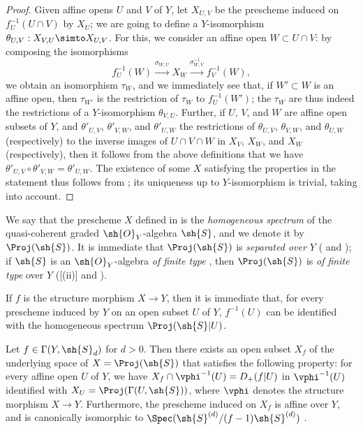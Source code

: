 \begin{proof}
Given affine opens $U$ and $V$ of $Y$, let $X_{U,V}$ be the prescheme induced on $f_U^{-1}(U\cap V)$ by $X_U$;
we are going to define a $Y$-isomorphism $\theta_{U,V}:X_{V,U}\simto X_{U,V}$.
For this, we consider an affine open $W\subset U\cap V$:
by composing the isomorphisms
\[
  f_U^{-1}(W)
  \xrightarrow{\sigma_{W,U}} X_W
  \xrightarrow{\sigma_{W,V}^{-1}} f_V^{-1}(W),
\]
we obtain an isomorphism $\tau_W$, and we immediately see that, if $W'\subset W$ is an affine open, then $\tau_{W'}$ is the restriction of $\tau_W$ to $f_U^{-1}(W')$;
the $\tau_W$ are thus indeed the restrictions of a $Y$-isomorphism $\theta_{V,U}$.
Further, if $U$, $V$, and $W$ are affine open subsets of $Y$, and $\theta'_{U,V}$, $\theta'_{V,W}$, and $\theta'_{U,W}$ the restrictions of $\theta_{U,V}$, $\theta_{V,W}$, and $\theta_{U,W}$ (respectively) to the inverse images of $U\cap V\cap W$ in $X_V$, $X_W$, and $X_W$ (respectively), then it follows from the above definitions that we have $\theta'_{U,V}\circ\theta'_{V,W}=\theta'_{U,W}$.
The existence of some $X$ satisfying the properties in the statement thus follows from ;
its uniqueness up to $Y$-isomorphism is trivial, taking  into account.
\end{proof}

\begin{env}[3.1.3]
\label{II.3.1.3}
We say that the prescheme $X$ defined in  is the \emph{homogeneous spectrum} of the quasi-coherent graded $\sh{O}_Y$-algebra $\sh{S}$, and we denote it by $\Proj(\sh{S})$.
It is immediate that $\Proj(\sh{S})$ is \emph{separated over $Y$} ( and );
if $\sh{S}$ is an $\sh{O}_Y$-algebra \emph{of finite type} , then $\Proj(\sh{S})$ is \emph{of finite type} over $Y$ ([(ii)] and ).

If $f$ is the structure morphism $X\to Y$, then it is immediate that, for every prescheme induced by $Y$ on an open subset $U$ of $Y$, $f^{-1}(U)$ can be identified with the homogeneous spectrum $\Proj(\sh{S}|U)$.
\end{env}

\begin{proposition}[3.1.4]
\label{II.3.1.4}
Let $f\in\Gamma(Y,\sh{S}_d)$ for $d>0$.
Then there exists an open subset $X_f$ of the underlying space of $X=\Proj(\sh{S})$ that satisfies the following property:
for every affine open $U$ of $Y$, we have $X_f\cap\vphi^{-1}(U)=D_+(f|U)$ in $\vphi^{-1}(U)$ identified with $X_U=\Proj(\Gamma(U,\sh{S}))$, where $\vphi$ denotes the structure morphism $X\to Y$.
Furthermore, the prescheme induced on $X_f$ is affine over $Y$, and is canonically isomorphic to $\Spec(\sh{S}^{(d)}/(f-1)\sh{S}^{(d)})$ .
\end{proposition}

